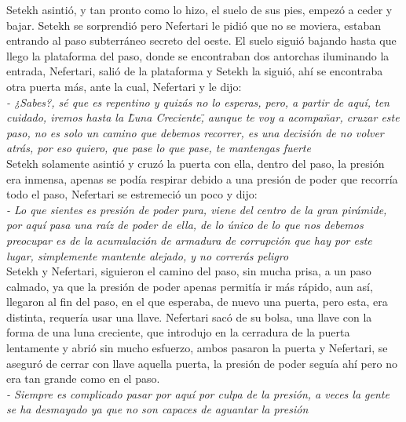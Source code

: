 Setekh asintió, y tan pronto como lo hizo, el suelo de sus pies, empezó a ceder y bajar. Setekh se sorprendió pero Nefertari le pidió que no se moviera, estaban entrando al paso subterráneo secreto del oeste. El suelo siguió bajando hasta que llego la plataforma del paso, donde se encontraban dos antorchas iluminando la entrada, Nefertari, salió de la plataforma y Setekh la siguió, ahí se encontraba otra puerta más, ante la cual, Nefertari y le dijo:\\
\textit{- ¿Sabes?, sé que es repentino y quizás no lo esperas, pero, a partir de aquí, ten cuidado, iremos hasta la \"Luna Creciente\", aunque te voy a acompañar, cruzar este paso, no es solo un camino que debemos recorrer, es una decisión de no volver atrás, por eso quiero, que pase lo que pase, te mantengas fuerte}\\
Setekh solamente asintió y cruzó la puerta con ella, dentro del paso, la presión era inmensa, apenas se podía respirar debido a una presión de poder que recorría todo el paso, Nefertari se estremeció un poco y dijo:\\
\textit{- Lo que sientes es presión de poder pura, viene del centro de la gran pirámide, por aquí pasa una raíz de poder de ella, de lo único de lo que nos debemos preocupar es de la acumulación de armadura de corrupción que hay por este lugar, simplemente mantente alejado, y no correrás peligro}\\
Setekh y Nefertari, siguieron el camino del paso, sin mucha prisa, a un paso calmado, ya que la presión de poder apenas permitía ir más rápido, aun así, llegaron al fin del paso, en el que esperaba, de nuevo una puerta, pero esta, era distinta, requería usar una llave.
Nefertari sacó de su bolsa, una llave con la forma de una luna creciente, que introdujo en la cerradura de la puerta lentamente y abrió sin mucho esfuerzo, ambos pasaron la puerta y Nefertari, se aseguró de cerrar con llave aquella puerta, la presión de poder seguía ahí pero no era tan grande como en el paso.\\
\textit{- Siempre es complicado pasar por aquí por culpa de la presión, a veces la gente se ha desmayado ya que no son capaces de aguantar la presión}\\

